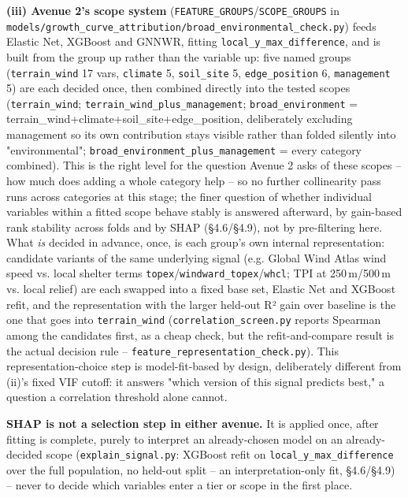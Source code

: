 \textbf{(iii) Avenue 2's scope system} (\texttt{FEATURE\_GROUPS}/\texttt{SCOPE\_GROUPS} in
\texttt{models/growth\_curve\_attribution/broad\_environmental\_check.py}) feeds Elastic Net,
XGBoost and GNNWR, fitting \texttt{local\_y\_max\_difference}, and is built from the group up
rather than the variable up: five named groups (\texttt{terrain\_wind} 17 vars,
\texttt{climate} 5, \texttt{soil\_site} 5, \texttt{edge\_position} 6, \texttt{management} 5) are
each decided once, then combined directly into the tested scopes
(\texttt{terrain\_wind}; \texttt{terrain\_wind\_plus\_management}; \texttt{broad\_environment} =
terrain\_wind+climate+soil\_site+edge\_position, deliberately excluding management so its own
contribution stays visible rather than folded silently into "environmental";
\texttt{broad\_environment\_plus\_management} = every category combined). This is the right level
for the question Avenue 2 asks of these scopes -- how much does adding a whole category help --
so no further collinearity pass runs across categories at this stage; the finer question of
whether individual variables within a fitted scope behave stably is answered afterward, by
gain-based rank stability across folds and by SHAP (\S4.6/\S4.9), not by pre-filtering here.
What \emph{is} decided in advance, once, is each group's own internal representation: candidate
variants of the same underlying signal (e.g. Global Wind Atlas wind speed vs. local shelter
terms \texttt{topex}/\texttt{windward\_topex}/\texttt{whcl}; TPI at 250\,m/500\,m vs. local
relief) are each swapped into a fixed base set, Elastic Net and XGBoost refit, and the
representation with the larger held-out R² gain over baseline is the one that goes into
\texttt{terrain\_wind} (\texttt{correlation\_screen.py} reports Spearman among the candidates
first, as a cheap check, but the refit-and-compare result is the actual decision rule --
\texttt{feature\_representation\_check.py}). This representation-choice step is model-fit-based
by design, deliberately different from (ii)'s fixed VIF cutoff: it answers "which version of
this signal predicts best," a question a correlation threshold alone cannot.

\textbf{SHAP is not a selection step in either avenue.} It is applied once, after fitting is
complete, purely to interpret an already-chosen model on an already-decided scope
(\texttt{explain\_signal.py}: XGBoost refit on \texttt{local\_y\_max\_difference} over the full
population, no held-out split -- an interpretation-only fit, \S4.6/\S4.9) -- never to decide which
variables enter a tier or scope in the first place.

